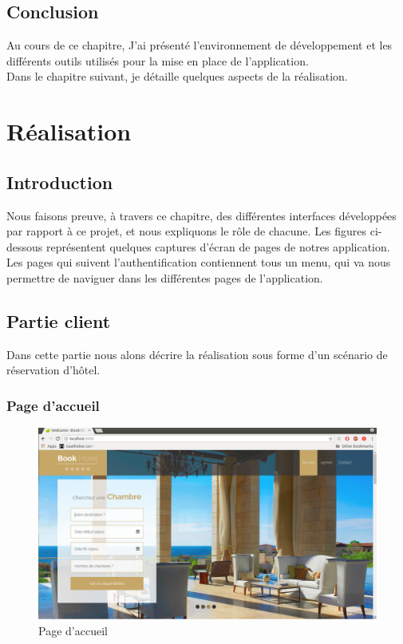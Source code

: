 \documentclass[12pt,a4paper]{report}
\begin{document}
		\section{Conclusion}
Au cours de ce chapitre, J'ai présenté l’environnement de développement et les différents outils utilisés pour la mise en place de l’application.\\
Dans le chapitre suivant, je détaille quelques aspects de la réalisation.













	\chapter{Réalisation}

	\section{Introduction}
Nous faisons preuve, à travers ce chapitre, des différentes interfaces développées par rapport
à ce projet, et nous expliquons le rôle de chacune.
Les figures ci-dessous représentent quelques captures d’écran de pages de notres application. Les pages qui suivent l’authentification contiennent tous un menu, qui va nous permettre de naviguer dans les différentes pages de l'application.\\


	\section{Partie client}
Dans cette partie nous alons décrire la réalisation sous forme d’un scénario de réservation d'hôtel.
	\newpage
	\subsection{Page d'accueil}
	\vspace{2cm}
	\begin{figure}[!hbtp]
		\centering
		\includegraphics[scale=0.3]{./graphics/home.png}
		\caption{Page d'accueil}
		\end{figure}
		\newpage
\end{document}
